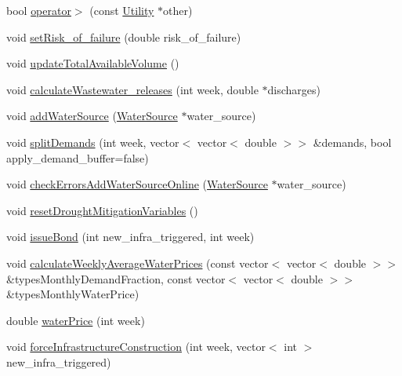 \begin{DoxyCompactItemize}
bool \mbox{\hyperlink{classUtility_a222897e8c338fde0d754df4683fbc89b_a222897e8c338fde0d754df4683fbc89b}{operator$>$}} (const \mbox{\hyperlink{classUtility}{Utility}} $\ast$other)
\item 
void \mbox{\hyperlink{classUtility_a68d5088951f6bdccbb7af18ea8f153f5_a68d5088951f6bdccbb7af18ea8f153f5}{set\+Risk\+\_\+of\+\_\+failure}} (double risk\+\_\+of\+\_\+failure)
\item 
void \mbox{\hyperlink{classUtility_af394fe9f04a371a7cf10ddadba575e85_af394fe9f04a371a7cf10ddadba575e85}{update\+Total\+Available\+Volume}} ()
\item 
void \mbox{\hyperlink{classUtility_a5feecc73d561de022eb6ba3c657b3dbc_a5feecc73d561de022eb6ba3c657b3dbc}{calculate\+Wastewater\+\_\+releases}} (int week, double $\ast$discharges)
\item 
void \mbox{\hyperlink{classUtility_aebbfd65c13e86cfeda8bdfbcc6712587_aebbfd65c13e86cfeda8bdfbcc6712587}{add\+Water\+Source}} (\mbox{\hyperlink{classWaterSource}{Water\+Source}} $\ast$water\+\_\+source)
\item 
void \mbox{\hyperlink{classUtility_ab578bbe9f346692d9251418f20fd2345_ab578bbe9f346692d9251418f20fd2345}{split\+Demands}} (int week, vector$<$ vector$<$ double $>$$>$ \&demands, bool apply\+\_\+demand\+\_\+buffer=false)
\item 
void \mbox{\hyperlink{classUtility_a0674d7d95f4d6595f7e01817a4d84a98_a0674d7d95f4d6595f7e01817a4d84a98}{check\+Errors\+Add\+Water\+Source\+Online}} (\mbox{\hyperlink{classWaterSource}{Water\+Source}} $\ast$water\+\_\+source)
\item 
void \mbox{\hyperlink{classUtility_af9ec9c2cb69166db021f03ce9ddf4d8e_af9ec9c2cb69166db021f03ce9ddf4d8e}{reset\+Drought\+Mitigation\+Variables}} ()
\item 
void \mbox{\hyperlink{classUtility_a152ceea2917ea7715e8fbf8aff24390f_a152ceea2917ea7715e8fbf8aff24390f}{issue\+Bond}} (int new\+\_\+infra\+\_\+triggered, int week)
\item 
void \mbox{\hyperlink{classUtility_a0189edb631c9596f094b15afeeb934fd_a0189edb631c9596f094b15afeeb934fd}{calculate\+Weekly\+Average\+Water\+Prices}} (const vector$<$ vector$<$ double $>$$>$ \&types\+Monthly\+Demand\+Fraction, const vector$<$ vector$<$ double $>$$>$ \&types\+Monthly\+Water\+Price)
\item 
double \mbox{\hyperlink{classUtility_a0dca2586b9ed761cdab3b0a344daf21c_a0dca2586b9ed761cdab3b0a344daf21c}{water\+Price}} (int week)
\item 
void \mbox{\hyperlink{classUtility_a7daa5b948a370eca83bc8c63890f6b19_a7daa5b948a370eca83bc8c63890f6b19}{force\+Infrastructure\+Construction}} (int week, vector$<$ int $>$ new\+\_\+infra\+\_\+triggered)
$$
\end{DoxyCompactItemize}
